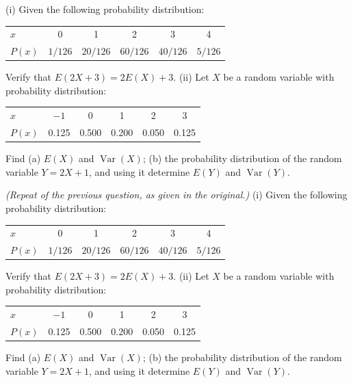 \documentclass[11pt,a4paper]{article}
\begin{document}
\begin{longlist}
\item (i) Given the following probability distribution:
\begin{center}
\begin{tabular}{l ccccc}
\toprule
$x$ & 0 & 1 & 2 & 3 & 4 \\
$P(x)$ & $1/126$ & $20/126$ & $60/126$ & $40/126$ & $5/126$ \\
\bottomrule
\end{tabular}
\end{center}
Verify that $E(2X+3)=2E(X)+3$. (ii) Let $X$ be a random variable with probability distribution:
\begin{center}
\begin{tabular}{l ccccc}
\toprule
$x$ & $-1$ & 0 & 1 & 2 & 3 \\
$P(x)$ & 0.125 & 0.500 & 0.200 & 0.050 & 0.125 \\
\bottomrule
\end{tabular}
\end{center}
Find (a) $E(X)$ and $\operatorname{Var}(X)$; (b) the probability distribution of the random variable $Y=2X+1$, and using it determine $E(Y)$ and $\operatorname{Var}(Y)$.

\item \emph{(Repeat of the previous question, as given in the original.)} (i) Given the following probability distribution:
\begin{center}
\begin{tabular}{l ccccc}
\toprule
$x$ & 0 & 1 & 2 & 3 & 4 \\
$P(x)$ & $1/126$ & $20/126$ & $60/126$ & $40/126$ & $5/126$ \\
\bottomrule
\end{tabular}
\end{center}
Verify that $E(2X+3)=2E(X)+3$. (ii) Let $X$ be a random variable with probability distribution:
\begin{center}
\begin{tabular}{l ccccc}
\toprule
$x$ & $-1$ & 0 & 1 & 2 & 3 \\
$P(x)$ & 0.125 & 0.500 & 0.200 & 0.050 & 0.125 \\
\bottomrule
\end{tabular}
\end{center}
Find (a) $E(X)$ and $\operatorname{Var}(X)$; (b) the probability distribution of the random variable $Y=2X+1$, and using it determine $E(Y)$ and $\operatorname{Var}(Y)$.


\end{longlist}
\end{document}
